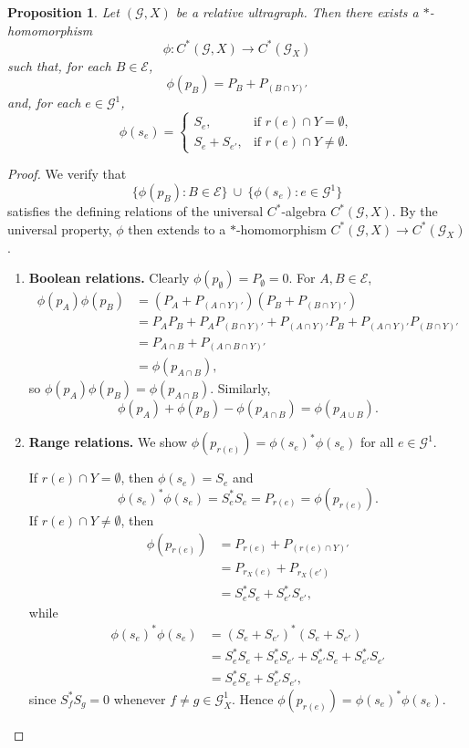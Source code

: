 \documentclass[12pt, reqno]{amsart}
\newtheorem{proposition}[theorem]{Proposition}
\theoremstyle{definition}
\theoremstyle{remark}
\numberwithin{equation}{section}
\begin{document}
\begin{proposition}
    \label{esfriou, vai dar tainha}
Let $(\mathcal{G}, X)$ be a relative ultragraph. Then there exists a 
$*$-homomorphism 
\[
\phi: C^*(\mathcal{G},X) \longrightarrow C^*(\mathcal{G}_X)
\]
such that, for each $B \in \mathcal{E}$,
\[
\phi(p_B) = P_B + P_{(B \cap Y)'}
\]
and, for each $e \in \mathcal{G}^1$,
\[
\phi(s_e) =
\begin{cases}
    S_e, & \text{if } r(e) \cap Y = \emptyset, \\[6pt]
    S_e + S_{e'}, & \text{if } r(e) \cap Y \neq \emptyset.
\end{cases}
\]
\end{proposition}

\begin{proof}
We verify that 
\[
\{\phi(p_B): B \in \mathcal{E}\}\ \cup\ \{\phi(s_e): e \in \mathcal{G}^1\}
\]
satisfies the defining relations of the universal $C^*$-algebra $C^*(\mathcal{G},X)$. 
By the universal property, $\phi$ then extends to a $*$-homomorphism 
$C^*(\mathcal{G},X)\to C^*(\mathcal{G}_X)$.

\begin{enumerate}
\item \textbf{Boolean relations.}
Clearly $\phi(p_{\emptyset})=P_{\emptyset}=0$. For $A,B\in\mathcal{E}$,
\begin{align*}
\phi(p_A)\phi(p_B)
&=(P_A+P_{(A\cap Y)'})(P_B+P_{(B\cap Y)'})\\
&=P_AP_B+P_AP_{(B\cap Y)'}+P_{(A\cap Y)'}P_B+P_{(A\cap Y)'}P_{(B\cap Y)'}\\
&=P_{A\cap B}+P_{(A\cap B\cap Y)'}\\
&=\phi(p_{A\cap B}),
\end{align*}
so $\phi(p_A)\phi(p_B)=\phi(p_{A\cap B})$. Similarly,
\[
\phi(p_A)+\phi(p_B)-\phi(p_{A\cap B})=\phi(p_{A\cup B}).
\]

\item \textbf{Range relations.}
We show $\phi(p_{r(e)})=\phi(s_e)^*\phi(s_e)$ for all $e\in\mathcal{G}^1$.

If $r(e)\cap Y=\emptyset$, then $\phi(s_e)=S_e$ and
\[
\phi(s_e)^*\phi(s_e)=S_e^*S_e=P_{r(e)}=\phi(p_{r(e)}).
\]
If $r(e)\cap Y\neq\emptyset$, then
\begin{align*}
\phi(p_{r(e)})&=P_{r(e)}+P_{(r(e)\cap Y)'}\\
&=P_{r_X(e)}+P_{r_X(e')}\\
&=S_e^*S_e+S_{e'}^*S_{e'},
\end{align*}
while
\begin{align*}
\phi(s_e)^*\phi(s_e)
&=(S_e+S_{e'})^*(S_e+S_{e'})\\
&=S_e^*S_e+S_e^*S_{e'}+S_{e'}^*S_e+S_{e'}^*S_{e'}\\
&=S_e^*S_e+S_{e'}^*S_{e'},
\end{align*}
since $S_f^*S_g=0$ whenever $f\ne g\in\mathcal{G}_X^1$. Hence $\phi(p_{r(e)})=\phi(s_e)^*\phi(s_e)$.


\end{enumerate}
\end{proof}
\end{document}
